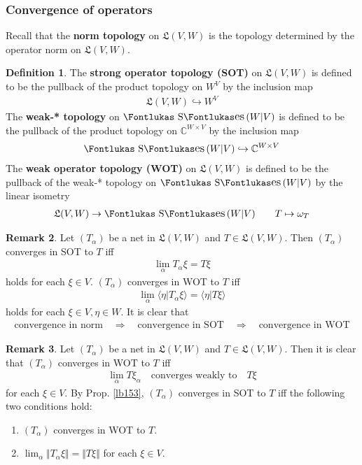 \documentclass[12pt,b5paper,notitlepage]{article}
\theoremstyle{definition}
\newtheorem{df}{Definition}[subsection]
\newtheorem{rem}[df]{Remark}
\theoremstyle{plain}
\DeclareMathOperator{\Ses}{\text{\Fontlukas S}\text{\kern -0pt {\Fontlukas\large es}}\,}
\newcommand{\fk}{\mathfrak}
\newcommand{\bk}[1]{\langle {#1}\rangle}
\newcommand{\Cbb}{\mathbb C}
\numberwithin{equation}{section}
\begin{document}
\subsubsection{Convergence of operators}


Recall that the \textbf{norm topology} on $\fk L(V,W)$ is the topology determined by the operator norm on $\fk L(V,W)$.

\begin{df}
The \textbf{strong operator topology (SOT)}   on $\fk L(V,W)$ is defined to be the pullback of the product topology on $W^V$ by the inclusion map
\begin{align*}
\fk L(V,W)\hookrightarrow W^V
\end{align*}
The \textbf{weak-* topology} \index{00@Weak-* topology on $\Ses(W\vert V)$} on $\Ses(W|V)$ is defined to be the pullback of the product topology on $\Cbb^{W\times V}$ by the inclusion map
\begin{align*}
\Ses(W|V)\hookrightarrow \Cbb^{W\times V}
\end{align*}
The \textbf{weak operator topology (WOT)}   on $\fk L(V,W)$ is defined to be the pullback of the weak-* topology on $\Ses(W|V)$ by the linear isometry
\begin{align*}
\fk L(V,W)\rightarrow\Ses(W|V)\qquad T\mapsto \omega_T
\end{align*}
\end{df}


\begin{rem}
Let $(T_\alpha)$ be a net in $\fk L(V,W)$ and $T\in\fk L(V,W)$. Then $(T_\alpha)$ converges in SOT to $T$ iff
\begin{align}
\lim_\alpha T_\alpha\xi=T\xi
\end{align}
holds for each $\xi\in V$. $(T_\alpha)$ converges in WOT to $T$ iff
\begin{align}
\lim_\alpha \bk{\eta|T_\alpha\xi}=\bk{\eta|T\xi}
\end{align}
holds for each $\xi\in V,\eta\in W$. It is clear that
\begin{align*}
\text{convergence in norm}\quad\Rightarrow\quad\text{convergence in SOT}\quad\Rightarrow\quad\text{convergence in WOT}
\end{align*}
\end{rem}


\begin{rem}\label{lb241}
Let $(T_\alpha)$ be a net in $\fk L(V,W)$ and $T\in\fk L(V,W)$. Then it is clear that $(T_\alpha)$ converges in WOT to $T$ iff
\begin{align*}
\lim_\alpha T\xi_\alpha\quad\text{converges weakly to}\quad T\xi
\end{align*}
for each $\xi\in V$. By Prop. \ref{lb153}, $(T_\alpha)$ converges in SOT to $T$ iff the following two conditions hold:
\begin{enumerate}[label=(\arabic*)]
\item $(T_\alpha)$ converges in WOT to $T$.
\item $\lim_\alpha \Vert T_\alpha\xi\Vert=\Vert T\xi\Vert$ for each $\xi\in V$.
\end{enumerate}
\end{rem}
\end{document}
